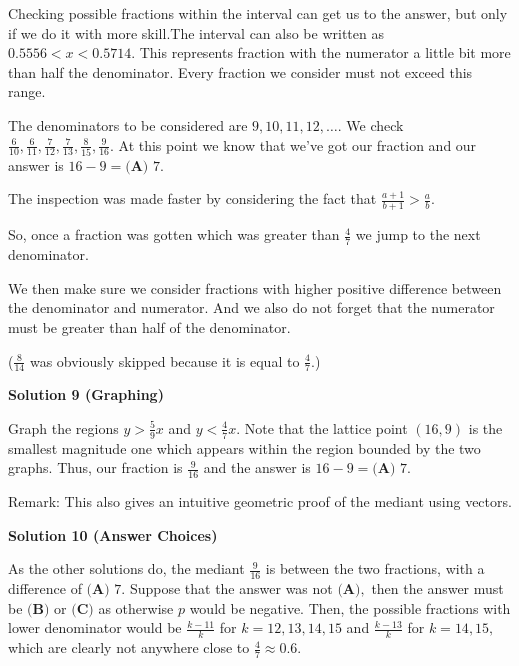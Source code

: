 \begin{enumerate}
Checking possible fractions within the interval can get us to the answer, but only if we do it with more skill.The interval can also be written as $0.5556<x<0.5714.$ This represents fraction with the numerator a little bit more than half the denominator. Every fraction we consider must not exceed this range. 

 The denominators to be considered are $9,10,11,12,\ldots.$ We check $\frac{6}{10}, \frac{6}{11}, \frac{7}{12}, \frac{7}{13}, \frac{8}{15}, \frac{9}{16}.$ At this point we know that we've got our fraction and our answer is $16-9=\boxed{\textbf{(A) } 7}.$

 The inspection was made faster by considering the fact that $\frac{a+1}{b+1}>\frac{a}{b}.$

 So, once a fraction was gotten which was greater than $\frac{4}{7}$ we jump to the next denominator. 

 We then make sure we consider fractions with higher positive difference between the denominator and numerator. And we also do not forget that the numerator must be greater than half of the denominator.

 ($\frac{8}{14}$ was obviously skipped because it is equal to $\frac{4}{7}.$)

 



\textbf{Solution 9 (Graphing)}

Graph the regions $y > \frac{5}{9}x$ and $y < \frac{4}{7}x.$ Note that the lattice point $(16,9)$ is the smallest magnitude one which appears within the region bounded by the two graphs. Thus, our fraction is $\frac{9}{16}$ and the answer is $16-9= \boxed{\textbf{(A) } 7}.$

 Remark: This also gives an intuitive geometric proof of the mediant using vectors.

 



\textbf{Solution 10 (Answer Choices)}

As the other solutions do, the mediant $\frac{9}{16}$ is between the two fractions, with a difference of $\boxed{\textbf{(A) } 7}.$ Suppose that the answer was not $\textbf{(A)},$ then the answer must be $\textbf{(B)}$ or $\textbf{(C)}$ as otherwise $p$ would be negative. Then, the possible fractions with lower denominator would be $\frac{k-11}{k}$ for $k=12,13,14,15$ and $\frac{k-13}{k}$ for $k=14,15,$ which are clearly not anywhere close to $\frac{4}{7}\approx 0.6.$





\end{enumerate}
